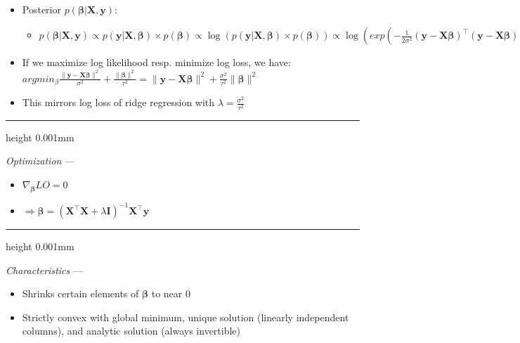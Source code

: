 \begin{itemize}
\begin{itemize}
\begin{itemize}
        \end{itemize}
        \item Posterior $p( \boldsymbol{\beta} | \boldsymbol{X}, \boldsymbol{y} )$: 
        \begin{itemize}
            \item $p( \boldsymbol{\beta} | \boldsymbol{X}, \boldsymbol{y} ) \propto p ( \boldsymbol{y} |\boldsymbol{X}, \boldsymbol{\beta} ) \times p( \boldsymbol{\beta} ) \propto \log (p ( \boldsymbol{y} |\boldsymbol{X}, \boldsymbol{\beta} ) \times p( \boldsymbol{\beta} )) \propto \log (exp ( -\frac{1}{2\sigma^2} (\boldsymbol{y} - \boldsymbol{X} \boldsymbol{\beta})^\intercal (\boldsymbol{y} - \boldsymbol{X} \boldsymbol{\beta}) ) \times exp( -\frac{1}{2T^2} \boldsymbol{\beta}^\intercal \boldsymbol{\beta} )) \propto -\frac{\|\boldsymbol{y} - \boldsymbol{X} \boldsymbol{\beta} \|^2}{\sigma^2} - \frac{\|\boldsymbol{\beta} \|^2}{\tau^2}$
        \end{itemize}
        \item If we maximize log likelihood resp. minimize log loss, we have: $argmin_{\beta} \frac{\|\boldsymbol{y} - \boldsymbol{X} \boldsymbol{\beta} \|^2}{\sigma^2} + \frac{\|\boldsymbol{\beta} \|^2}{\tau^2} = \|\boldsymbol{y} - \boldsymbol{X} \boldsymbol{\beta} \|^2 + \frac{\sigma^2}{\tau^2}\|\boldsymbol{\beta} \|^2$
        \item This mirrors log loss of ridge regression with $\lambda = \frac{\sigma^2}{\tau^2}$
    \end{itemize}
\end{itemize}

{\color{lightgray}\hrule height 0.001mm}

\emph{Optimization} ---
\begin{itemize}
    \item $\nabla_{\boldsymbol{\beta}} LO = 0$
    \item $\Rightarrow \boldsymbol{\beta} = (\boldsymbol{X}^\intercal \boldsymbol{X} + \lambda \boldsymbol{I})^{-1}  \boldsymbol{X}^\intercal \boldsymbol{y}$
\end{itemize}

{\color{lightgray}\hrule height 0.001mm}

\emph{Characteristics} ---
\begin{itemize}
    \item Shrinks certain elements of $\boldsymbol{\beta}$ to near 0
    \item Strictly convex with global minimum, unique solution (linearly independent columns), and analytic solution (always invertible)
\end{itemize}

